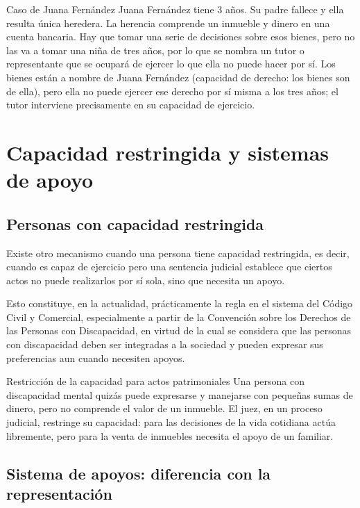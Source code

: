 \documentclass[12pt,oneside]{book}
\begin{document}
\begin{example}{Caso de Juana Fernández}
Juana Fernández tiene 3 años. Su padre fallece y ella resulta única heredera. La herencia comprende un inmueble y dinero en una cuenta bancaria. Hay que tomar una serie de decisiones sobre esos bienes, pero no las va a tomar una niña de tres años, por lo que se nombra un tutor o representante que se ocupará de ejercer lo que ella no puede hacer por sí. Los bienes están a nombre de Juana Fernández (capacidad de derecho: los bienes son de ella), pero ella no puede ejercer ese derecho por sí misma a los tres años; el tutor interviene precisamente en su capacidad de ejercicio.
\end{example}

\section{Capacidad restringida y sistemas de apoyo}

\subsection{Personas con capacidad restringida}

Existe otro mecanismo cuando una persona tiene capacidad restringida, es decir, cuando es capaz de ejercicio pero una sentencia judicial establece que ciertos actos no puede realizarlos por sí sola, sino que necesita un apoyo.

Esto constituye, en la actualidad, prácticamente la regla en el sistema del Código Civil y Comercial, especialmente a partir de la Convención sobre los Derechos de las Personas con Discapacidad, en virtud de la cual se considera que las personas con discapacidad deben ser integradas a la sociedad y pueden expresar sus preferencias aun cuando necesiten apoyos.

\begin{example}{Restricción de la capacidad para actos patrimoniales}
Una persona con discapacidad mental quizás puede expresarse y manejarse con pequeñas sumas de dinero, pero no comprende el valor de un inmueble. El juez, en un proceso judicial, restringe su capacidad: para las decisiones de la vida cotidiana actúa libremente, pero para la venta de inmuebles necesita el apoyo de un familiar.
\end{example}

\subsection{Sistema de apoyos: diferencia con la representación}
\end{document}

